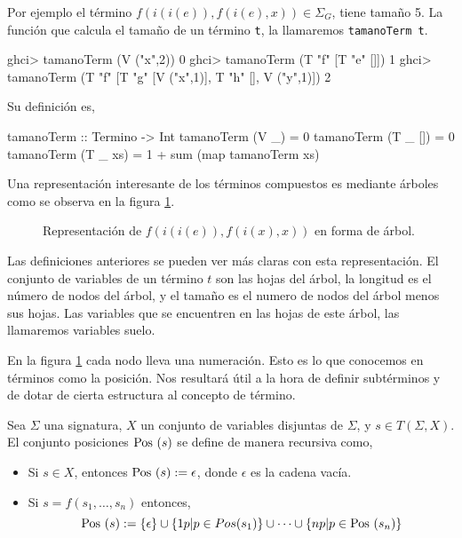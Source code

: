 Por ejemplo el término $f(i(i(e)),f(i(e),x)) \in \Sigma_G$, tiene
tamaño 5.  La función que calcula el tamaño de un término \texttt{t},
la llamaremos \texttt{tamanoTerm t}.

\begin{sesion}
ghci> tamanoTerm (V ("x",2))
0
ghci> tamanoTerm (T "f" [T "e" []])
1
ghci> tamanoTerm (T "f" [T "g" [V ("x",1)], T "h" [], V ("y",1)])
2
\end{sesion}

Su definición es,

\begin{codigo}
tamanoTerm :: Termino -> Int
tamanoTerm (V _)    = 0
tamanoTerm (T _ []) = 0
tamanoTerm (T _ xs) = 1 + sum (map tamanoTerm xs)
\end{codigo}

Una representación interesante de los términos compuestos es mediante
árboles como se observa en la figura \ref{fig:termino}.

\begin{figure}[h]
  \label{fig:termino}
  \centering
  \caption{Representación de $f(i(i(e)),f(i(x),x))$ en forma de
    árbol.}
\end{figure}

Las definiciones anteriores se pueden ver más claras con esta
representación. El conjunto de variables de un término $t$ son las
hojas del árbol, la longitud es el número de nodos del árbol, y el
tamaño es el numero de nodos del árbol menos sus hojas. Las variables
que se encuentren en las hojas de este árbol, las llamaremos variables
suelo.

En la figura \ref{fig:termino} cada nodo lleva una numeración. Esto
es lo que conocemos en términos como la posición. Nos resultará útil a
la hora de definir subtérminos y de dotar de cierta estructura al
concepto de término.

\begin{defi}
  Sea $\Sigma$ una signatura, $X$ un conjunto de variables disjuntas
  de $\Sigma$, y $s \in T(\Sigma, X)$. El conjunto posiciones
  $\mbox{Pos } (s)$ se define de manera recursiva como,
\begin{itemize}

\item Si $s \in X$, entonces $\mbox{Pos }(s) := {\epsilon}$, donde $\epsilon$
  es la cadena vacía.
\item Si $s = f(s_1, \dots, s_n)$ entonces,
$$ \mbox{Pos }(s) := \{\epsilon\} \cup \{1p | p \in Pos(s_1) \} \cup \dots \cup \{np | p \in \mbox{Pos }(s_n) \}$$
\end{itemize}
\end{defi}

